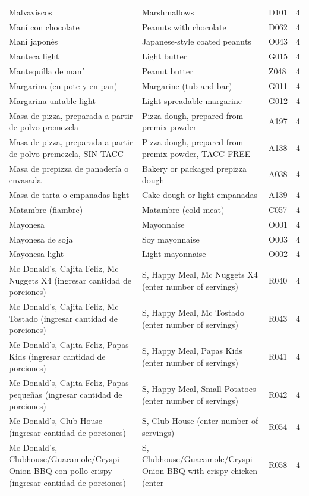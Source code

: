 {\begin{longtable}{p{4.3cm}p{5.5cm}p{1.5cm}p{0.7cm}}
Malvaviscos & Marshmallows & D101 & 4\\
Maní con chocolate & Peanuts with chocolate & D062 & 4\\
Maní japonés & Japanese-style coated peanuts & O043 & 4\\
Manteca light & Light butter & G015 & 4\\
Mantequilla de maní & Peanut butter & Z048 & 4\\
Margarina (en pote y en pan) & Margarine (tub and bar) & G011 & 4\\
Margarina untable light & Light spreadable margarine & G012 & 4\\
Masa de pizza, preparada a partir de polvo premezcla & Pizza dough, prepared from premix powder & A197 & 4\\
Masa de pizza, preparada a partir de polvo premezcla, SIN TACC & Pizza dough, prepared from premix powder, TACC FREE & A138 & 4\\
Masa de prepizza de panadería o envasada & Bakery or packaged prepizza dough & A038 & 4\\
Masa de tarta o empanadas light & Cake dough or light empanadas & A139 & 4\\
Matambre (fiambre) & Matambre (cold meat) & C057 & 4\\
Mayonesa & Mayonnaise & O001 & 4\\
Mayonesa de soja & Soy mayonnaise & O003 & 4\\
Mayonesa light & Light mayonnaise & O002 & 4\\
Mc Donald’s, Cajita Feliz, Mc Nuggets X4 (ingresar cantidad de porciones) & S, Happy Meal, Mc Nuggets X4 (enter number of servings) & R040 & 4\\
Mc Donald’s, Cajita Feliz, Mc Tostado (ingresar cantidad de porciones) & S, Happy Meal, Mc Tostado (enter number of servings) & R043 & 4\\
Mc Donald’s, Cajita Feliz, Papas Kids (ingresar cantidad de porciones) & S, Happy Meal, Papas Kids (enter number of servings) & R041 & 4\\
Mc Donald’s, Cajita Feliz, Papas pequeñas (ingresar cantidad de porciones) & S, Happy Meal, Small Potatoes (enter number of servings) & R042 & 4\\
Mc Donald’s, Club House (ingresar cantidad de porciones) & S, Club House (enter number of servings) & R054 & 4\\
Mc Donald’s, Clubhouse/Guacamole/Cryspi Onion BBQ con pollo crispy (ingresar cantidad de porciones) & S, Clubhouse/Guacamole/Cryspi Onion BBQ with crispy chicken (enter & R058 & 4\\

\end{longtable}}
